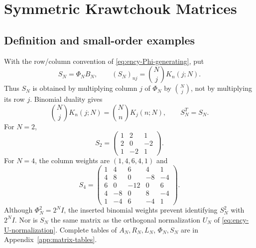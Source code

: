 \chapter{Symmetric Krawtchouk Matrices}
\label{ch:16}

\section{Definition and small-order examples}
\label{sec:matrix-S-definition}
With the row/column convention of \eqref{eq:ency-Phi-generating}, put
\begin{equation}\label{eq:ency-S-definition}
S_N=\Phi_NB_N,\qquad
(S_N)_{nj}=\binom NjK_n(j;N).
\end{equation}
Thus $S_N$ is obtained by multiplying column $j$ of $\Phi_N$ by
$\binom Nj$, not by multiplying its row $j$.
Binomial duality gives
\[
\binom NjK_n(j;N)=\binom NnK_j(n;N),
\qquad S_N^T=S_N.
\]
For $N=2$,
\[
S_2=\begin{pmatrix}1&2&1\\2&0&-2\\1&-2&1\end{pmatrix}.
\]
For $N=4$, the column weights are $(1,4,6,4,1)$ and
\[
S_4=\begin{pmatrix}
1&4&6&4&1\\
4&8&0&-8&-4\\
6&0&-12&0&6\\
4&-8&0&8&-4\\
1&-4&6&-4&1
\end{pmatrix}.
\]
Although $\Phi_N^2=2^NI$, the inserted binomial weights prevent
identifying $S_N^2$ with $2^NI$. Nor is $S_N$ the same matrix as the
orthogonal normalization $U_N$ of
\eqref{eq:ency-U-normalization}. Complete tables of $A_N,R_N,L_N$,
$\Phi_N,S_N$ are in Appendix~\ref{app:matrix-tables}.

